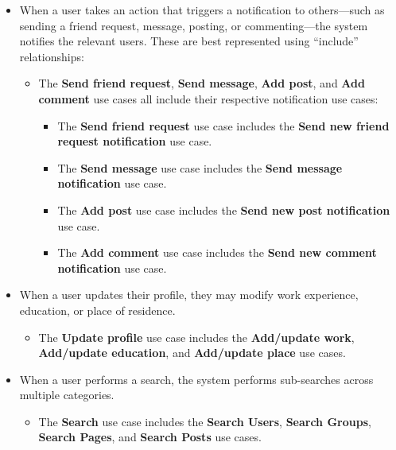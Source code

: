 \begin{itemize}
\item
\protect{}\label{ANyTU2AprtuNrjUDmxAeR}
When a user takes an action that triggers a notification to others---such as sending a friend request, message, posting, or commenting---the system notifies the relevant users. These are best represented using ``include'' relationships:

\begin{itemize}
\item
The \textbf{Send friend request}, \textbf{Send message}, \textbf{Add post}, and \textbf{Add comment} use cases all include their respective notification use cases:

\begin{itemize}
\item
The \textbf{Send friend request} use case includes the \textbf{Send new friend request notification} use case.
\item
The \textbf{Send message} use case includes the \textbf{Send message notification} use case.
\item
The \textbf{Add post} use case includes the \textbf{Send new post notification} use case.
\item
The \textbf{Add comment} use case includes the \textbf{Send new comment notification} use case.
\end{itemize}
\end{itemize}
\item
\protect{}\label{YPyqnO0Jh6JtXPtY7ZSQn}
When a user updates their profile, they may modify work experience, education, or place of residence.

\begin{itemize}
\item
The \textbf{Update profile} use case includes the \textbf{Add/update work}, \textbf{Add/update education}, and \textbf{Add/update place} use cases.
\end{itemize}
\item
\protect{}\label{Fqc0LCbM_qrtthNVxiDlc}
When a user performs a search, the system performs sub-searches across multiple categories.

\begin{itemize}
\item
The \textbf{Search} use case includes the \textbf{Search Users}, \textbf{Search Groups}, \textbf{Search Pages}, and \textbf{Search Posts} use cases.
\end{itemize}
\end{itemize}

